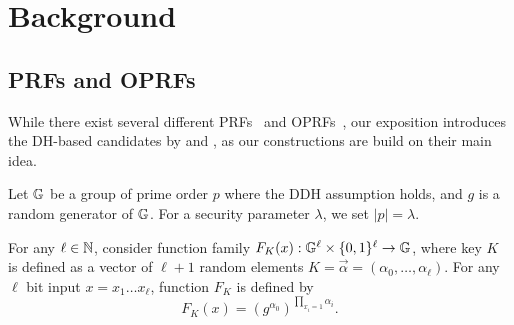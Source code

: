 \section{Background}

\subsection{PRFs and OPRFs}
While there exist several different
PRFs~\cite{chaum,prf,dodis,ggm,lewko,bonehprf} and
OPRFs~\cite{oprf,stan,chase,koles,boneh,kia}, our exposition
introduces the DH-based candidates by \citet{prf} and \citet{oprf}, as
our constructions are build on their main idea.

Let $\mathbb{G}$ be a group of prime order $p$ where the DDH assumption
holds, and $g$ is a random generator of $\mathbb{G}$. For a security
parameter $\lambda$, we set $|p|=\lambda$.


\begin{construction} \label{nrprf}
For any $\ell\in{\mathbb{N}}$, consider function family
$F_K(x):\mathbb{G}^{\ell}\times\{0,1\}^\ell\rightarrow\mathbb{G}$, where key $K$
is defined as a vector of $\ell+1$ random elements
$K=\vec{\alpha}=(\alpha_0,\ldots,\alpha_\ell)$.  For any $\ell$ bit input
$x=x_1 \ldots x_\ell$, function $F_K$ is
defined by
 $$F_K(x) = (g^{\alpha_0})^{\prod_{x_i=1}\alpha_i}.$$

\end{construction}

